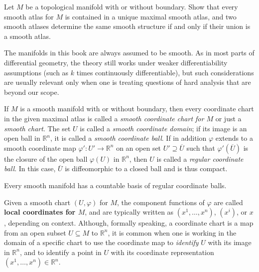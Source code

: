 \begin{exercise}
\label{exer:maximal-smooth-atlas}
Let $M$ be a topological manifold with or without boundary. Show that every smooth atlas for $M$ is contained in a unique maximal smooth atlas, and two smooth atlases determine the same smooth structure if and only if their union is a smooth atlas.
\end{exercise}

The manifolds in this book are always assumed to be smooth. As in most parts of differential geometry, the theory still works under weaker differentiability assumptions (such as $k$ times continuously differentiable), but such considerations are usually relevant only when one is treating questions of hard analysis that are beyond our scope.

If $M$ is a smooth manifold with or without boundary, then every coordinate chart in the given maximal atlas is called a \emph{smooth coordinate chart for $M$} or just a \emph{smooth chart}. The set $U$ is called a \emph{smooth coordinate domain}; if its image is an open ball in $\mathbb{R}^n$, it is called a \emph{smooth coordinate ball}. If in addition $\varphi$ extends to a smooth coordinate map $\varphi' : U' \to \mathbb{R}^n$ on an open set $U' \supseteq \overline{U}$ such that $\varphi'(\overline{U})$ is the closure of the open ball $\varphi(U)$ in $\mathbb{R}^n$, then $U$ is called a \emph{regular coordinate ball}. In this case, $\overline{U}$ is diffeomorphic to a closed ball and is thus compact.

\begin{proposition}
\label{prop:countable-basis-regular-coordinate-balls}
Every smooth manifold has a countable basis of regular coordinate balls.
\end{proposition}

Given a smooth chart $(U, \varphi)$ for $M$, the component functions of $\varphi$ are called \textbf{local coordinates for $M$}, and are typically written as $(x^1, \ldots, x^n)$, $(x^i)$, or $x$, depending on context. Although, formally speaking, a coordinate chart is a map from an open subset $U \subseteq M$ to $\mathbb{R}^n$, it is common when one is working in the domain of a specific chart to use the coordinate map to \textit{identify} $U$ with its image in $\mathbb{R}^n$, and to identify a point in $U$ with its coordinate representation $(x^1, \ldots, x^n) \in \mathbb{R}^n$.

